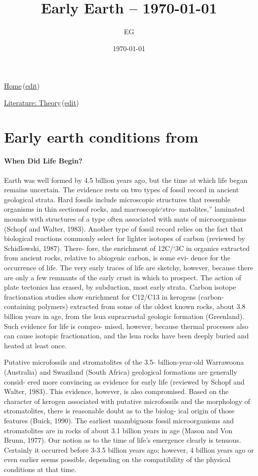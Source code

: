 \documentclass[12pt]{paper}
\title{Early Earth -- \today}
\author{EG}
\date{\today}
\newcommand{\wikilink}[2] { \href{#1.pdf}{#2}\,(\href{#1.tex}{edit})}
\begin{document}
 \maketitle
\wikilink{home}{Home}

\wikilink{literature\_theory}{Literature: Theory}

\section{Early earth conditions from  \cite{Pace1991}}
\paragraph{When Did Life Begin?}
Earth was well formed by 4.5 billion years ago, but the time
 at which life began remains uncertain. The evidence rests
on two types of fossil record in ancient geological strata.
Hard fossils include microscopic structures that resemble
organisms in thin sectionsof rocks, and macroscopic‘stro-
matolites,” laminated mounds with structures of a type
often associated with mats of microorganisms (Schopf and
Walter, 1983). Another type of fossil record relies on the
fact that biological reactions commonly select for lighter
isotopes of carbon (reviewed by Schidlowski, 1987). There-
fore, the enrichment of 12C/‘3C in organics extracted from
ancient rocks, relative to abiogenic carbon, is some evi-
dence for the occurrence of life. The very early traces of
life are sketchy, however, because there are only a few
remnants of the early crust in which to prospect. The action
of plate tectonics has erased, by subduction, most early
strata. 
Carbon isotope fractionation studies show enrichment for C12/C13 in kerogens (carbon-containing
 polymers)
extracted from some of the oldest known rocks, about 3.8
billion years in age, from the lsua supracrustal geologic
formation (Greenland). Such evidence for life is compro-
mised, however, because thermal processes also can
cause isotopic fractionation, and the lsua rocks have been
deeply buried and heated at least once.

Putative microfossils and stromatolites  of the 3.5-
billion-year-old
 Warrawoona
 (Australia) and Swaziland
(South Africa) geological formations are generally consid-
ered more convincing as evidence for early life (reviewed
by Schopf and Walter, 1983). This evidence, however, is
also compromised.
 Based on the character of kerogen associated with putative microfossils and the morphology
of stromatolites, there is reasonable doubt as to the biolog-
ical origin of those features (Buick, 1990). The earliest
unambiguous fossil microorganisms and stromatolites are
in rocks of about 3.1 billion years in age (Mason and Von
Brunn, 1977). Our notion as to the time of life’s emergence
clearly is tenuous. Certainly it occurred before 3-3.5 billion
years ago; however, 4 billion years ago or even earlier
seems possible, depending on the compatibility of the
physical conditions at that time.
\end{document}
